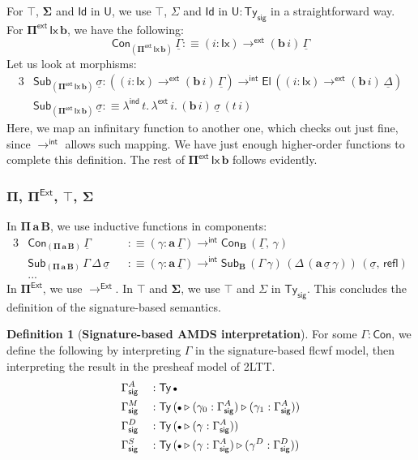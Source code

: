 \documentclass[12pt,a4paper,twoside,openany]{book}
\theoremstyle{remark}
\theoremstyle{definition}
\newtheorem{mydefinition}{Definition}
\theoremstyle{theorem}
\newcommand{\ms}[1]{\mathsf{#1}}
\newcommand{\bs}[1]{\boldsymbol{#1}}
\newcommand{\toind}{\to^{\ms{int}}}
\newcommand{\Tys}{\ms{Ty_{sig}}}
\newcommand{\refl}{\mathsf{refl}}
\newcommand{\Con}{\mathsf{Con}}
\newcommand{\Sub}{\mathsf{Sub}}
\newcommand{\Ty}{\mathsf{Ty}}
\newcommand{\U}{\mathsf{U}}
\newcommand{\El}{\mathsf{El}}
\newcommand{\Id}{\mathsf{Id}}
\newcommand{\ext}{\triangleright}
\newcommand{\emptycon}{\scaleobj{.75}\bullet}
\newcommand{\Pie}{\Pi^{\mathsf{Ext}}}
\newcommand{\toe}{\to^{\ms{Ext}}}
\newcommand{\Piinf}{\Pi^{\mathsf{ext}}}
\newcommand{\toinf}{\to^{\ms{ext}}}
\newcommand{\lambdainf}{\lambda^{\ms{ext}}}
\newcommand{\bPiinf}{\bs{\Piinf}}
\newcommand{\ba}{\bs{a}}
\newcommand{\bb}{\bs{b}}
\newcommand{\bB}{\bs{B}}
\newcommand{\bU}{\bs{\U}}
\newcommand{\bId}{\bs{\Id}}
\newcommand{\ul}[1]{\underline{#1}}
\newcommand{\ulGamma}{\ul{\Gamma}}
\newcommand{\ulDelta}{\ul{\Delta}}
\newcommand{\ulsigma}{\ul{\sigma}}
\newcommand{\defn}{:\equiv}
\begin{document}
For $\bs{\top}$, $\bs{\Sigma}$ and $\bId$ in $\bU$, we use $\top$, $\Sigma$ and
$\Id$ in $\U : \Tys$ in a straightforward way. For $\bPiinf\,\ms{Ix}\,\bb$, we
have the following:
\[
   \Con_{(\bPiinf\,\ms{Ix}\,\bb)}\,\ulGamma \defn (i : \ms{Ix}) \toinf (\bb\,i)\,\ulGamma
\]
Let us look at morphisms:
\begin{alignat*}{3}
  &\Sub_{(\bPiinf\,\ms{Ix}\,\bb)}\,\ulsigma : ((i : \ms{Ix}) \toinf (\bb\,i)\,\ulGamma)
    \toind \El\,((i : \ms{Ix}) \toinf (\bb\,i)\,\ulDelta)\\
  &\Sub_{(\bPiinf\,\ms{Ix}\,\bb)}\,\ulsigma \defn \lambda^{\ms{ind}}\,t.\,\lambdainf\,i.\,
    (\bb\,i)\,\ulsigma\,(t\,i)
\end{alignat*}
Here, we map an infinitary function to another one, which checks out just fine,
since $\toind$ allows such mapping. We have just enough higher-order functions
to complete this definition. The rest of $\bPiinf\,\ms{Ix}\,\bb$ follows evidently.

\subsubsection{$\bs{\Pi}$, $\bs{\Pie}$, $\bs{\top}$, $\bs{\Sigma}$}

In $\bs{\Pi\,a\,B}$, we use inductive functions in components:
\begin{alignat*}{3}
  &\Con_{(\bs{\Pi\,a\,B})}\,\ulGamma &&\defn (\gamma : \ba\,\ulGamma) \toind \Con_{\bB}\,(\ulGamma,\,\gamma)\\
  &\Sub_{(\bs{\Pi\,a\,B})}\,\Gamma\,\Delta\,\ulsigma &&\defn (\gamma : \ba\,\ulGamma) \toind \Sub_{\bB}\,(\Gamma\,\gamma)\,(\Delta\,(\ba\,\ulsigma\,\gamma))\,(\ulsigma,\,\refl)\\
  & ... &&
\end{alignat*}
In $\bs{\Pie}$, we use $\toe$. In $\bs{\top}$ and $\bs{\Sigma}$, we use $\top$ and $\Sigma$ in $\Tys$. This concludes the definition of the signature-based semantics.

\begin{mydefinition}[\textbf{Signature-based AMDS interpretation}]
For some $\Gamma : \Con$, we define the following by interpreting $\Gamma$ in
the signature-based flcwf model, then interpreting the result in the presheaf
model of 2LTT.
\begin{alignat*}{3}
  &\Gamma^A_{\ms{sig}} &&: \Ty\,\emptycon \\
  &\Gamma^M_{\ms{sig}} &&: \Ty\,(\emptycon\ext(\gamma_0 : \Gamma^A_{\ms{sig}})\ext(\gamma_1 : \Gamma^A_{\ms{sig}}))\\
  &\Gamma^D_{\ms{sig}} &&: \Ty\,(\emptycon\ext(\gamma : \Gamma^A_{\ms{sig}}))\\
  &\Gamma^S_{\ms{sig}} &&: \Ty\,(\emptycon\ext(\gamma : \Gamma^A_{\ms{sig}})\ext(\gamma^D : \Gamma^D_{\ms{sig}}))
\end{alignat*}
\end{mydefinition}
\end{document}
